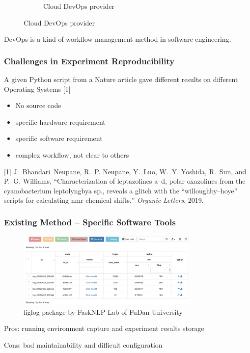 \documentclass[notheorems]{beamer}
\begin{document}
\begin{frame}
\begin{figure}
\begin{subfigure}{0.4\textwidth}
		\caption{Cloud DevOps provider}
	\end{subfigure}
\end{figure}  
DevOps is a kind of workflow management method in software engineering.
\end{frame}

\begin{frame}
\frametitle{Challenges in Experiment Reproducibility}

A given Python script from a Nature article gave different results on different Operating Systems [1]

\begin{itemize}
\item No source code
\item specific hardware requirement
\item specific software requirement
\item complex workflow, not clear to others
\end{itemize}

\vskip 1cm
{\tiny [1] J.~Bhandari~Neupane, R.~P. Neupane, Y.~Luo, W.~Y. Yoshida, R.~Sun, and P.~G.
  Williams, ``Characterization of leptazolines a--d, polar oxazolines from the
  cyanobacterium leptolyngbya sp., reveals a glitch with the
  “willoughby--hoye” scripts for calculating nmr chemical shifts,''
  \emph{Organic Letters}, 2019.
 } 
 
\end{frame}

\begin{frame}
\frametitle{Existing Method -- Specific Software Tools}

\begin{figure}
\includegraphics[width=0.8\textwidth]{pic/fitlog_table.png}
\caption{figlog package by FaskNLP Lab of FuDan University}
\end{figure}
Pros: running environment capture and experiment results storage

Cons: bad maintainability and difficult configuration
\end{frame}
\end{document}
